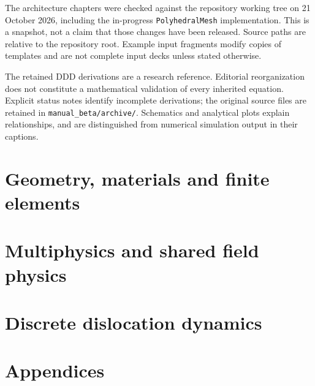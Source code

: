 \documentclass[10pt,letterpaper]{report}
\newcommand{\code}[1]{\nolinkurl{#1}}
\begin{document}
The architecture chapters were checked against the repository working tree on 21 October 2026, including the in-progress \code{PolyhedralMesh} implementation. This is a snapshot, not a claim that those changes have been released. Source paths are relative to the repository root. Example input fragments modify copies of templates and are not complete input decks unless stated otherwise.

The retained DDD derivations are a research reference. Editorial reorganization does not constitute a mathematical validation of every inherited equation. Explicit status notes identify incomplete derivations; the original source files are retained in \code{manual_beta/archive/}. Schematics and analytical plots explain relationships, and are distinguished from numerical simulation output in their captions.
\tableofcontents
\clearpage{}
\part{Geometry, materials and finite elements}



\part{Multiphysics and shared field physics}




\part{Discrete dislocation dynamics}


\appendix
\part{Appendices}









\end{document}

